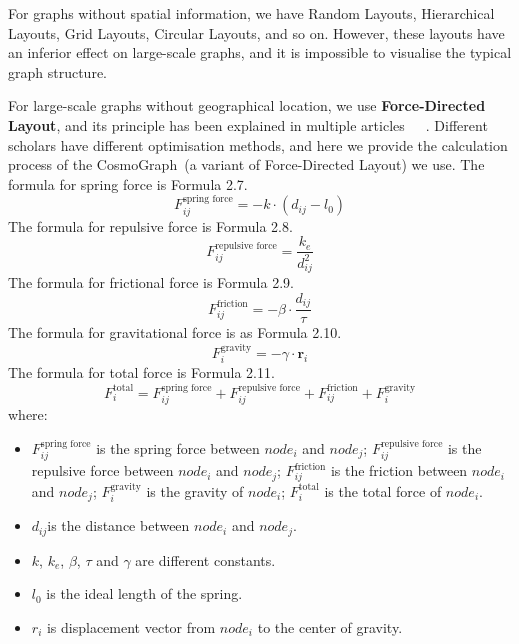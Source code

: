 \documentclass[ %
                    author={Tengyao Tu},
                supervisor={Dr. James Pope},
                    degree={MSc},
                     title={A New Perspective on Graph Community Detection: Combining Traditional Methods with Deep Learning Approaches},
                  subtitle={Applying to Telecom Networks and Diverse Datasets},
                      type={},
                      year={2024}]{dissertation}
\begin{document}
For graphs without spatial information, we have Random Layouts, Hierarchical Layouts, Grid Layouts, Circular Layouts, and so on. However, these layouts have an inferior effect on large-scale graphs, and it is impossible to visualise the typical graph structure.

For large-scale graphs without geographical location, we use \textbf{Force-Directed Layout}, and its principle has been explained in multiple articles~\cite{hu2005efficient}~\cite{lin2012new}~\cite{kobourov2012spring}. Different scholars have different optimisation methods, and here we provide the calculation process of the CosmoGraph~\cite{cosmograph2024}(a variant of Force-Directed Layout) we use.
The formula for spring force is Formula 2.7.
\begin{equation}
F_{ij}^{\text{spring force}} = -k \cdot (d_{ij} - l_0)
\label{eq: springforce}
\end{equation}
The formula for repulsive force is Formula 2.8.
\begin{equation}
F_{ij}^{\text{repulsive force}} = \frac{k_e}{d_{ij}^2}
\label{eq: repulsizeforce}
\end{equation}
The formula for frictional force is Formula 2.9.
\begin{equation}
F_{ij}^{\text{friction}} = -\beta \cdot \frac{d_{ij}}{\tau}
\label{eq: frictionalforce}
\end{equation}
The formula for gravitational force is as Formula 2.10.
\begin{equation}
F_{i}^{\text{gravity}} = -\gamma \cdot \mathbf{r}_{i}
\label{eq: gravity}
\end{equation}
The formula for total force is Formula 2.11.
\begin{equation}
F_{i}^{\text{total}} = F_{ij}^{\text{spring force}}+F_{ij}^{\text{repulsive force}}+F_{ij}^{\text{friction}}+F_{i}^{\text{gravity}}
\label{eq: total}
\end{equation}
where:
\begin{itemize}
  \item $F_{ij}^{\text{spring force}}$ is the spring force between $node_i$ and $node_j$; $F_{ij}^{\text{repulsive force}}$ is the repulsive force between $node_i$ and $node_j$; $F_{ij}^{\text{friction}}$ is the friction between $node_i$ and $node_j$; $F_{i}^{\text{gravity}}$ is the gravity of $node_i$; $F_{i}^{\text{total}}$ is the total force of $node_i$.
  \item $d_{ij}$is the distance between $node_i$ and $node_j$.
  \item $k$, $k_e$, $\beta$, $\tau$ and $\gamma$ are different constants.
  \item $l_0$ is the ideal length of the spring.
  \item $r_i$ is displacement vector from $node_i$ to the center of gravity.
\end{itemize}
\end{document}
